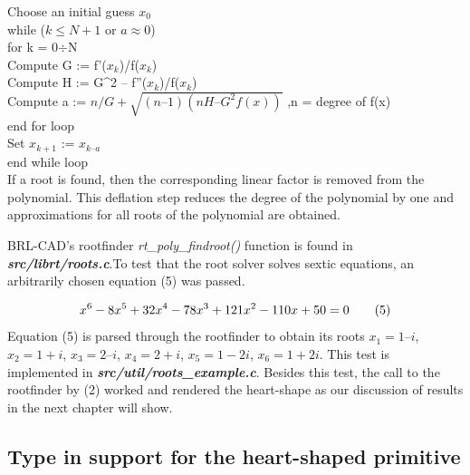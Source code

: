 Choose an initial guess $x_0$  \\
\hspace{40}while ($k \leq N+1$  or  $a \approx 0$) \\
\hspace{60}for k = 0$\div$N \\
\hspace{90}Compute  G := f'($x_k$)/f($x_k$) \\ 
\hspace{90}Compute  H := G^2 – f''($x_k$)/f($x_k$) \\ 
\hspace{90}Compute  a := $n/G + \sqrt{(n–1)(nH – G^2f(x))}$ ,n = degree of f(x) \\
\hspace{60}end for loop \\
\hspace{40}Set $x_{k+1}$ := $x_{k – a}$\\ 
\hspace{40}end while loop \\

If   a   root   is   found,   then   the   corresponding   linear   factor   is   removed   from   the  
polynomial.   This   deflation   step   reduces   the   degree   of   the   polynomial   by   one  
and approximations for all roots of the polynomial are obtained. 
 
\hspace{30} BRL-­CAD's   root­finder   \textit{rt\_poly\_findroot()}   function   is   found   in  
\textit{\textbf{src/librt/roots.c}}.To test that the   root   solver solves sextic  
equations, an arbitrarily chosen equation (5)  was passed.  

\begin{equation*}
\centering
 x^6 -­ 8x^5 + 32x^4 - 78x^3 + 121x^2 - ­110x + 50 = 0­­­­­ \tag{5}  
\end{equation*}
Equation (5) is parsed through the   root­finder   to   obtain   its   roots   $x_1 = 1 – i$, $x_2 = 1 + i$, $x_3 = 2 – i$, $x_4 = 2 +
i$, $x_5 = 1­ - 2i$, $x_6 = 1 + 2i$. This   test   is   implemented   in   \textit{\textbf{src/util/roots\_example.c}}.  
Besides   this   test,   the   call   to   the   root­finder   by   (2)   worked   and   rendered   the  
heart-shape as our discussion of results in the next chapter will show.  

\subsection{Type in support for the heart-­shaped primitive}

